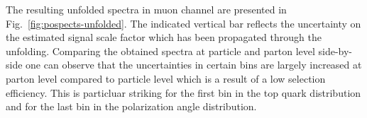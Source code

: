 {\hspace{0.02\textwidth}
}

The resulting unfolded spectra in muon channel are presented in Fig.~\ref{fig:pospects-unfolded}. The indicated vertical bar reflects the uncertainty on the estimated signal scale factor which has been propagated through the unfolding. Comparing the obtained spectra at particle and parton level side-by-side one can observe that the uncertainties in certain bins are largely increased at parton level compared to particle level which is a result of a low selection efficiency. This is particluar striking for the first bin in the top quark \pt distribution and for the last bin in the polarization angle distribution.


